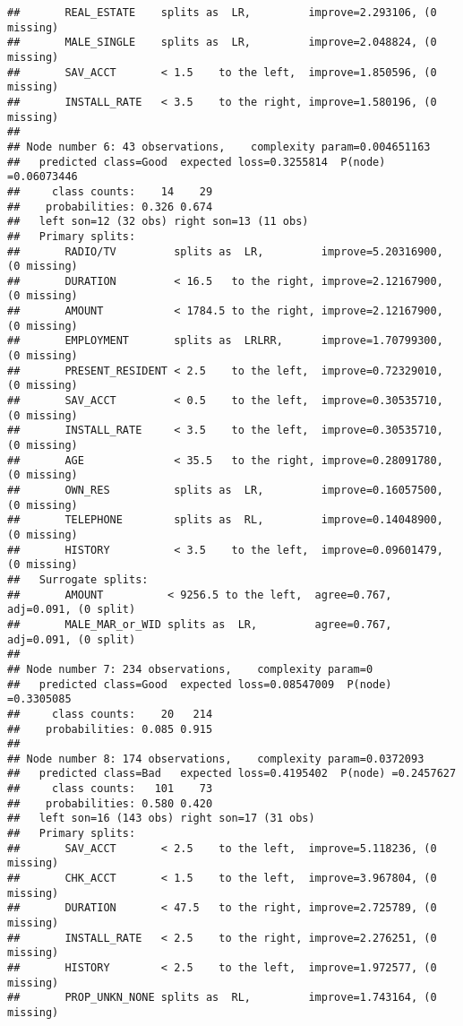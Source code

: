 \documentclass[
]{article}
\begin{document}
\begin{verbatim}
##       REAL_ESTATE    splits as  LR,         improve=2.293106, (0 missing)
##       MALE_SINGLE    splits as  LR,         improve=2.048824, (0 missing)
##       SAV_ACCT       < 1.5    to the left,  improve=1.850596, (0 missing)
##       INSTALL_RATE   < 3.5    to the right, improve=1.580196, (0 missing)
## 
## Node number 6: 43 observations,    complexity param=0.004651163
##   predicted class=Good  expected loss=0.3255814  P(node) =0.06073446
##     class counts:    14    29
##    probabilities: 0.326 0.674 
##   left son=12 (32 obs) right son=13 (11 obs)
##   Primary splits:
##       RADIO/TV         splits as  LR,         improve=5.20316900, (0 missing)
##       DURATION         < 16.5   to the right, improve=2.12167900, (0 missing)
##       AMOUNT           < 1784.5 to the right, improve=2.12167900, (0 missing)
##       EMPLOYMENT       splits as  LRLRR,      improve=1.70799300, (0 missing)
##       PRESENT_RESIDENT < 2.5    to the left,  improve=0.72329010, (0 missing)
##       SAV_ACCT         < 0.5    to the left,  improve=0.30535710, (0 missing)
##       INSTALL_RATE     < 3.5    to the left,  improve=0.30535710, (0 missing)
##       AGE              < 35.5   to the right, improve=0.28091780, (0 missing)
##       OWN_RES          splits as  LR,         improve=0.16057500, (0 missing)
##       TELEPHONE        splits as  RL,         improve=0.14048900, (0 missing)
##       HISTORY          < 3.5    to the left,  improve=0.09601479, (0 missing)
##   Surrogate splits:
##       AMOUNT          < 9256.5 to the left,  agree=0.767, adj=0.091, (0 split)
##       MALE_MAR_or_WID splits as  LR,         agree=0.767, adj=0.091, (0 split)
## 
## Node number 7: 234 observations,    complexity param=0
##   predicted class=Good  expected loss=0.08547009  P(node) =0.3305085
##     class counts:    20   214
##    probabilities: 0.085 0.915 
## 
## Node number 8: 174 observations,    complexity param=0.0372093
##   predicted class=Bad   expected loss=0.4195402  P(node) =0.2457627
##     class counts:   101    73
##    probabilities: 0.580 0.420 
##   left son=16 (143 obs) right son=17 (31 obs)
##   Primary splits:
##       SAV_ACCT       < 2.5    to the left,  improve=5.118236, (0 missing)
##       CHK_ACCT       < 1.5    to the left,  improve=3.967804, (0 missing)
##       DURATION       < 47.5   to the right, improve=2.725789, (0 missing)
##       INSTALL_RATE   < 2.5    to the right, improve=2.276251, (0 missing)
##       HISTORY        < 2.5    to the left,  improve=1.972577, (0 missing)
##       PROP_UNKN_NONE splits as  RL,         improve=1.743164, (0 missing)

\end{verbatim}
\end{document}
